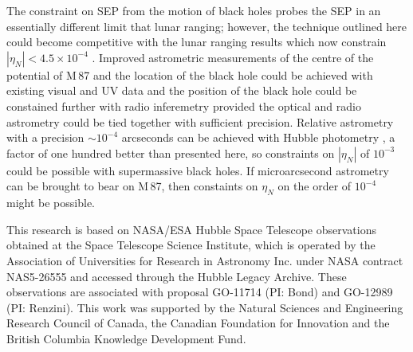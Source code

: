\documentclass[useAMS,usenatbib]{mn2e}
\begin{document}
The constraint on SEP from the motion of black holes probes the SEP in
an essentially different limit that lunar ranging; however, the
technique outlined here could become competitive with the lunar
ranging results which now constrain $|\eta_N|<4.5 \times 10^{-4}$
\citep{Baess:1999}.  Improved astrometric measurements of the centre
of the potential of M\,87 and the location of the black hole could be
achieved with existing visual and UV data and the position of the
black hole could be constained further with radio inferemetry provided
the optical and radio astrometry could be tied together with
sufficient precision.  Relative astrometry with a precision $\sim
10^{-4}$ arcseconds can be achieved with Hubble photometry
\citep[e.g.][]{Heyl116397dyn}, a factor of one hundred better than
presented here, so constraints on $|\eta_N|$ of $10^{-3}$ could be
possible with supermassive black holes.  If microarcsecond astrometry
can be brought to bear \citep[e.g.][]{2011ApJ...735...57B} on M\,87,
then constaints on $\eta_N$ on the order of $10^{-4}$ might be possible.

This research is based on NASA/ESA Hubble Space Telescope observations
obtained at the Space Telescope Science Institute, which is operated
by the Association of Universities for Research in Astronomy
Inc. under NASA contract NAS5-26555 and accessed through the Hubble
Legacy Archive. These observations are associated with proposal
GO-11714 (PI: Bond) and GO-12989 (PI: Renzini).  This work was
supported by the Natural Sciences and Engineering Research Council of
Canada, the Canadian Foundation for Innovation and the British
Columbia Knowledge Development Fund.





\label{lastpage}
\end{document}
